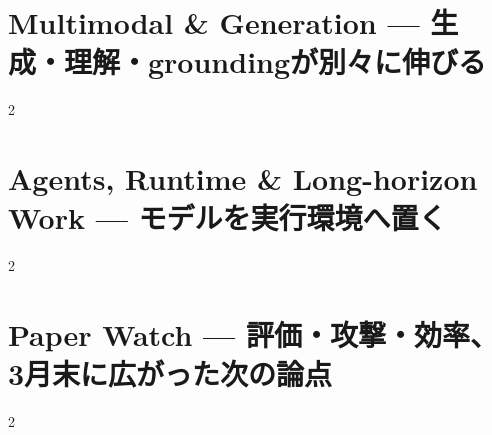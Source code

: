 \documentclass[lualatex,a4paper,11pt]{jlreq}
\begin{document}
\Needspace{0.45\textheight}
\bigskip
\section{Multimodal \& Generation — 生成・理解・groundingが別々に伸びる}
\label{pkg:multimodal-generation-march}
\vspace{0.15em}

\vspace{0.2em}
\begin{multicols}{2}

\end{multicols}

\medskip


\Needspace{0.45\textheight}
\bigskip
\section{Agents, Runtime \& Long-horizon Work — モデルを実行環境へ置く}
\label{pkg:agents-runtime-long-horizon-march}
\vspace{0.15em}

\vspace{0.2em}
\begin{multicols}{2}

\end{multicols}

\medskip


\Needspace{0.45\textheight}
\bigskip
\section{Paper Watch — 評価・攻撃・効率、3月末に広がった次の論点}
\label{pkg:paper-watch-march}
\vspace{0.15em}

\vspace{0.2em}
\begin{multicols}{2}

\end{multicols}

\medskip


\Needspace{0.40\textheight}
\bigskip

\bigskip
\printbibliography[title={References / Source Notes}]
\end{document}
